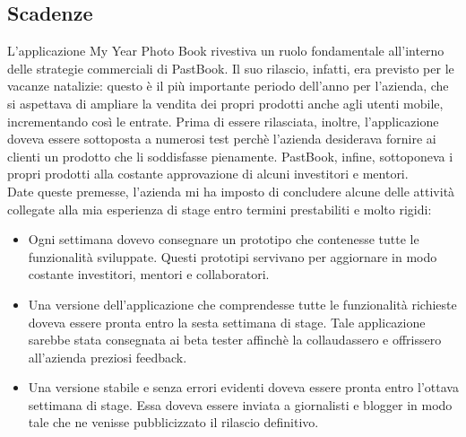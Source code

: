 		\subsection{Scadenze}
			L'applicazione My Year Photo Book rivestiva un ruolo fondamentale all'interno delle strategie commerciali di PastBook. Il suo
			rilascio, infatti, era previsto per le vacanze natalizie: questo è il più importante periodo dell'anno per l'azienda, che si
			aspettava di ampliare la vendita dei propri prodotti anche agli utenti mobile, incrementando così le entrate. Prima di essere
			rilasciata, inoltre, l'applicazione doveva essere sottoposta a numerosi test perchè l'azienda desiderava fornire ai clienti
			un prodotto che li soddisfasse pienamente. PastBook, infine, sottoponeva i propri prodotti alla costante approvazione di
			alcuni investitori e mentori.\\
			Date queste premesse, l'azienda mi ha imposto di concludere alcune delle attività collegate alla mia esperienza di stage
			entro termini prestabiliti e molto rigidi:
			\begin{itemize}
				\item Ogni settimana dovevo consegnare un prototipo che contenesse tutte le funzionalità sviluppate. Questi prototipi
				servivano per aggiornare in modo costante investitori, mentori e collaboratori.
				\item Una versione dell'applicazione che comprendesse tutte le funzionalità richieste doveva essere pronta entro
				la sesta settimana di stage. Tale applicazione sarebbe stata consegnata ai beta tester affinchè la collaudassero e
				offrissero all'azienda preziosi feedback.
				\item Una versione stabile e senza errori evidenti doveva essere pronta entro l'ottava settimana di stage. Essa
				doveva essere inviata a giornalisti e blogger in modo tale che ne venisse pubblicizzato il rilascio definitivo.
			\end{itemize}
